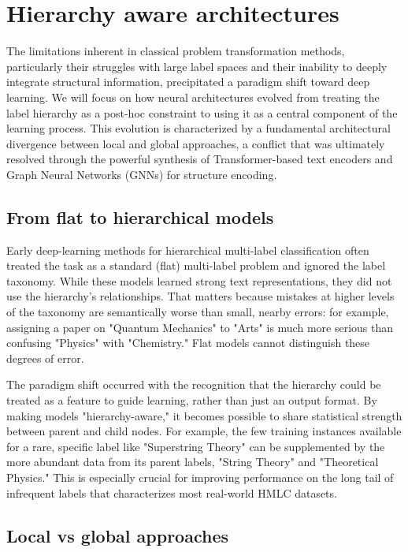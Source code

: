\section{Hierarchy aware architectures}
The limitations inherent in classical problem transformation methods, particularly their struggles with large label spaces and their inability to deeply integrate structural information, precipitated a paradigm shift toward deep learning.
We will focus on how neural architectures evolved from treating the label hierarchy as a post-hoc constraint to using it as a central component of the learning process.
This evolution is characterized by a fundamental architectural divergence between local and global approaches, a conflict that was ultimately resolved through the powerful synthesis of Transformer-based text encoders and Graph Neural Networks (GNNs) for structure encoding.

\subsection{From flat to hierarchical models}
Early deep-learning methods for hierarchical multi-label classification often treated the task as a standard (flat) multi-label problem and ignored the label taxonomy. While these models learned strong text representations, they did not use the hierarchy's relationships. That matters because mistakes at higher levels of the taxonomy are semantically worse than small, nearby errors: for example, assigning a paper on "Quantum Mechanics" to "Arts" is much more serious than confusing "Physics" with "Chemistry." Flat models cannot distinguish these degrees of error.~\cite{xu-etal-2021-hierarchical}

The paradigm shift occurred with the recognition that the hierarchy could be treated as a feature to guide learning, rather than just an output format. By making models "hierarchy-aware," it becomes possible to share statistical strength between parent and child nodes. For example, the few training instances available for a rare, specific label like "Superstring Theory" can be supplemented by the more abundant data from its parent labels, "String Theory" and "Theoretical Physics." This is especially crucial for improving performance on the long tail of infrequent labels that characterizes most real-world HMLC datasets.~\cite{Zangari2024}

\subsection{Local vs global approaches}

